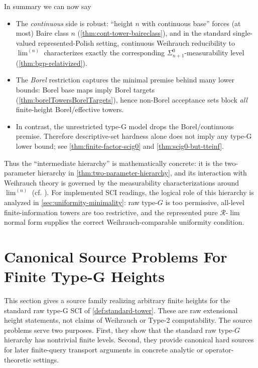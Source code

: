 \documentclass{lmcs} %
\theoremstyle{plain}
\theoremstyle{plain}
\theoremstyle{definition}
\theoremstyle{remark}
\theoremstyle{definition}
\theoremstyle{remark}
\numberwithin{equation}{section}
\newcommand{\Lim}{\operatorname{lim}}
\newcommand{\Limi}[1]{\Lim^{(#1)}}
\begin{document}
In summary we can now say

\begin{itemize}
\item The \textit{continuous} side is robust: \enquote{height $n$ with continuous base} forces (at most) Baire class $n$ (\cref{thm:cont-tower-baireclass}), and in the standard single-valued represented-Polish setting, continuous Weihrauch reducibility to \(\Limi{n}\) characterizes exactly the corresponding $\Sigma^0_{n+1}$-measurability level (\cref{thm:bgp-relativized}).

\item The \textit{Borel} restriction captures the minimal premise behind many lower bounds:
Borel base maps imply Borel targets (\cref{thm:borelTowersBorelTargets}), hence non-Borel acceptance sets block \textit{all} finite-height Borel/effective towers.

\item In contrast, the unrestricted type-G model drops the Borel/continuous premise.
Therefore descriptive-set hardness alone does not imply any type-G lower bound; see \cref{thm:finite-factor-scig0} and \cref{thm:scig0-but-tteinf}.
\end{itemize}

Thus the \enquote{intermediate hierarchy} is mathematically concrete: it is the two-parameter hierarchy in \cref{thm:two-parameter-hierarchy}, and its interaction with Weihrauch theory is governed by the measurability characterizations around $\Limi{n}$ (cf. \cite[Theorem 6.5]{brattka2021weihrauch}). For implemented SCI readings, the logical role of this hierarchy is analyzed in \cref{sec:uniformity-minimality}: raw type-\(G\) is too permissive, all-level finite-information towers are too restrictive, and the represented pure \(\mathcal R\)-\(\Lim\) normal form supplies the correct Weihrauch-comparable uniformity condition.

\section{Canonical Source Problems For Finite Type-G Heights}{\label{sec:ExampleSCI}}

This section gives a source family realizing arbitrary finite heights for the standard
raw type-G SCI of \cref{def:standard-tower}. These are raw extensional height statements, not claims of Weihrauch or Type-2 computability. The source problems serve two purposes. First, they show that the standard raw type-\(G\) hierarchy has nontrivial finite levels. Second, they provide
canonical hard sources for later finite-query transport arguments in concrete analytic or operator-theoretic settings.
\end{document}
